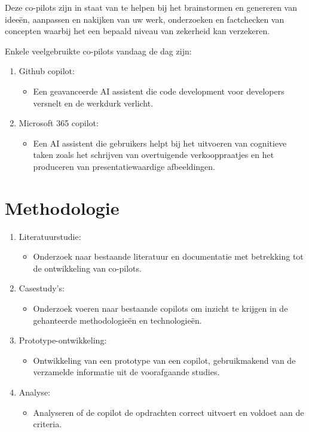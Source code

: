 \documentclass{hogent-article}
\begin{document}
Deze co-pilots zijn in staat van te helpen bij het brainstormen en genereren van ideeën, aanpassen en nakijken van uw werk, onderzoeken en factchecken van concepten waarbij het een bepaald niveau van zekerheid kan verzekeren. 

Enkele veelgebruikte co-pilots vandaag de dag zijn: 
\begin{enumerate}
  \item Github copilot:
    \begin{itemize}
      \item Een geavanceerde AI assistent die code development voor developers versnelt en de werkdurk verlicht. 
    \end{itemize}
  \item Microsoft 365 copilot: 
    \begin{itemize}
      \item Een AI assistent die gebruikers helpt bij het uitvoeren van cognitieve taken zoals het schrijven van overtuigende verkooppraatjes en het produceren van presentatiewaardige afbeeldingen. 
    \end{itemize}
\end{enumerate}


\section{Methodologie}
\begin{enumerate}
  \item Literatuurstudie: 
  \begin{itemize}
    \item Onderzoek naar bestaande literatuur en documentatie met betrekking tot de ontwikkeling van co-pilots.
  \end{itemize}
  \item Casestudy's: 
  \begin{itemize}
    \item Onderzoek voeren naar bestaande copilots om inzicht te krijgen in de gehanteerde methodologieën en technologieën.
  \end{itemize}
  \item Prototype-ontwikkeling: 
  \begin{itemize}
    \item Ontwikkeling van een prototype van een copilot, gebruikmakend van de verzamelde informatie uit de voorafgaande studies.
  \end{itemize}
  \item Analyse:
  \begin{itemize}
    \item Analyseren of de copilot de opdrachten correct uitvoert en voldoet aan de criteria.
  \end{itemize}
\end{enumerate}
\end{document}
